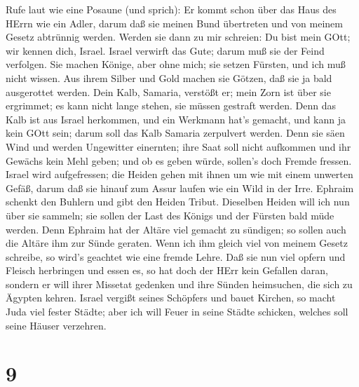  Rufe laut wie eine Posaune (und sprich): Er kommt schon
über das Haus des HErrn wie ein Adler, darum daß sie meinen Bund
übertreten und von meinem Gesetz abtrünnig werden.  Werden
sie dann zu mir schreien: Du bist mein GOtt; wir kennen dich, Israel.
 Israel verwirft das Gute; darum muß sie der Feind
verfolgen.  Sie machen Könige, aber ohne mich; sie setzen
Fürsten, und ich muß nicht wissen. Aus ihrem Silber und Gold machen sie
Götzen, daß sie ja bald ausgerottet werden.  Dein Kalb,
Samaria, verstößt er; mein Zorn ist über sie ergrimmet; es kann nicht
lange stehen, sie müssen gestraft werden.  Denn das Kalb ist
aus Israel herkommen, und ein Werkmann hat's gemacht, und kann ja kein
GOtt sein; darum soll das Kalb Samaria zerpulvert werden. 
Denn sie säen Wind und werden Ungewitter einernten; ihre Saat soll nicht
aufkommen und ihr Gewächs kein Mehl geben; und ob es geben würde,
sollen's doch Fremde fressen.  Israel wird aufgefressen; die
Heiden gehen mit ihnen um wie mit einem unwerten Gefäß, 
darum daß sie hinauf zum Assur laufen wie ein Wild in der Irre. Ephraim
schenkt den Buhlern und gibt den Heiden Tribut.  Dieselben
Heiden will ich nun über sie sammeln; sie sollen der Last des Königs und
der Fürsten bald müde werden.  Denn Ephraim hat der Altäre
viel gemacht zu sündigen; so sollen auch die Altäre ihm zur Sünde
geraten.  Wenn ich ihm gleich viel von meinem Gesetz
schreibe, so wird's geachtet wie eine fremde Lehre.  Daß
sie nun viel opfern und Fleisch herbringen und essen es, so hat doch der
HErr kein Gefallen daran, sondern er will ihrer Missetat gedenken und
ihre Sünden heimsuchen, die sich zu Ägypten kehren.  Israel
vergißt seines Schöpfers und bauet Kirchen, so macht Juda viel fester
Städte; aber ich will Feuer in seine Städte schicken, welches soll seine
Häuser verzehren.

\hypertarget{section-8}{%
\section{9}\label{section-8}}

